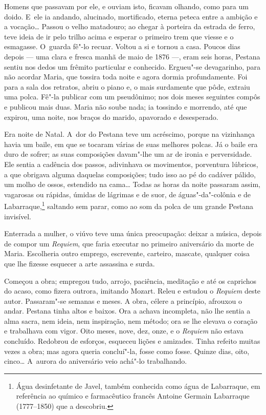 \begin{linenumbers}
Homens que passavam por ele, e ouviam isto, ficavam olhando, como para
um doido. E~ele ia andando, alucinado, mortificado, eterna peteca entre
a ambição e a vocação\ldots{} Passou o velho matadouro; ao chegar à porteira
da estrada de ferro, teve ideia de ir pelo trilho acima e esperar o
primeiro trem que viesse e o esmagasse. O~guarda fê"-lo recuar. Voltou a
si e tornou a casa. Poucos dias depois --- uma clara e fresca manhã de
maio de 1876 ---, eram seis horas, Pestana sentiu nos dedos um frêmito
particular e conhecido. Ergueu"-se devagarinho, para não acordar Maria,
que tossira toda noite e agora dormia profundamente. Foi para a sala dos
retratos, abriu o piano e, o mais surdamente que pôde, extraiu uma
polca. Fê"-la publicar com um pseudônimo; nos dois meses seguintes compôs
e publicou mais duas. Maria não soube nada; ia tossindo e morrendo, até
que expirou, uma noite, nos braços do marido, apavorado e desesperado.

Era noite de Natal. A~dor do Pestana teve um acréscimo, porque na
vizinhança havia um baile, em que se tocaram várias de suas melhores
polcas. Já o baile era duro de sofrer; as suas composições davam"-lhe um
ar de ironia e perversidade. Ele sentia a cadência dos passos,
adivinhava os movimentos, porventura lúbricos, a que obrigava alguma
daquelas composições; tudo isso ao pé do cadáver pálido, um molho de
ossos, estendido na cama\ldots{} Todas as horas da noite passaram assim,
vagarosas ou rápidas, úmidas de lágrimas e de suor, de águas"-da"-colônia
e de Labarraque,\footnote{Água desinfetante de Javel, também conhecida
  como água de Labarraque, em referência ao químico e farmacêutico
  francês Antoine Germain Labarraque (1777--1850) que a descobriu.}
saltando sem parar, como ao som da polca de um grande Pestana invisível.

Enterrada a mulher, o viúvo teve uma única preocupação: deixar a música,
depois de compor um \emph{Requiem}, que faria executar no primeiro
aniversário da morte de Maria. Escolheria outro emprego, escrevente,
carteiro, mascate, qualquer coisa que lhe fizesse esquecer a arte
assassina e surda.

Começou a obra; empregou tudo, arrojo, paciência, meditação e até os
caprichos do acaso, como fizera outrora, imitando Mozart. Releu e
estudou o \emph{Requiem} deste autor. Passaram"-se semanas e meses. A
obra, célere a princípio, afrouxou o andar. Pestana tinha altos e
baixos. Ora a achava incompleta, não lhe sentia a alma sacra, nem ideia,
nem inspiração, nem método; ora se lhe elevava o coração e trabalhava
com vigor. Oito meses, nove, dez, onze, e o \emph{Requiem} não estava
concluído. Redobrou de esforços, esqueceu lições e amizades. Tinha
refeito muitas vezes a obra; mas agora queria concluí"-la, fosse como
fosse. Quinze dias, oito, cinco\ldots{} A~aurora do aniversário veio achá"-lo
trabalhando.


\end{linenumbers}
